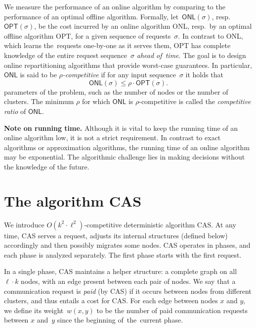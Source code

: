 \documentclass[a4paper,anonymous,USenglish]{lipics-v2019}
\newcommand{\OPT}{\textsf{OPT}\xspace}
\newcommand{\ONL}{\textsf{ONL}\xspace}
\newcommand{\DET}{\textsf{CAS}\xspace}
\begin{document}
We measure
the performance of an online algorithm by comparing to the performance of an optimal offline
algorithm. Formally, let~$\ONL(\sigma)$, resp.~$\OPT(\sigma)$, be the cost
incurred by an online algorithm \ONL, resp.~by an optimal offline
algorithm \OPT, for a given sequence of requests~$\sigma$. In contrast to \ONL, which learns the~requests one-by-one as
it serves them, \OPT has complete knowledge of the entire request
sequence~$\sigma$ \emph{ahead of~time}. The goal is to design online repartitioning
algorithms that provide worst-case guarantees. In particular, $\ONL$ is said
to be \emph{$\rho$-competitive} if for any
input sequence~$\sigma$ it holds that
\[
    \ONL(\sigma) \leq \rho \cdot \OPT(\sigma).
\]
parameters of the problem, such as the number of nodes or the number of clusters.
The minimum $\rho$ for which $\ONL$ is $\rho$-competitive is called the 
\emph{competitive ratio} of $\ONL$. 

\noindent
\textbf{Note on running time.}
Although it is vital to keep the running time of an online algorithm low, it is
not a strict requirement. In contrast to exact algorithms or approximation
algorithms, the running time of an online algorithm may be exponential.
The algorithmic challenge lies in making decisions without the knowledge of the
future.


\section{The algorithm CAS}
\label{sec:upper}

We introduce $O(k^2
\cdot \ell^2)$-competitive deterministic algorithm \DET. At any time, \DET
serves a request, adjusts its internal structures (defined below)
accordingly and then possibly migrates some nodes. \DET operates in phases, and each
phase is analyzed separately. The first phase starts with the first request.

In a single phase, \DET maintains a helper structure: a complete graph on all
$\ell \cdot k$ nodes, with an edge present between each pair of nodes. We say
that a communication request is \emph{paid} (by \DET) if it occurs between
nodes from different clusters, and thus entails a cost for \DET. For each edge
between nodes $x$ and $y$, we define its weight~$w(x,y)$ to be the number of
paid communication requests between $x$ and~$y$ since the beginning of~the~current phase.
\end{document}
